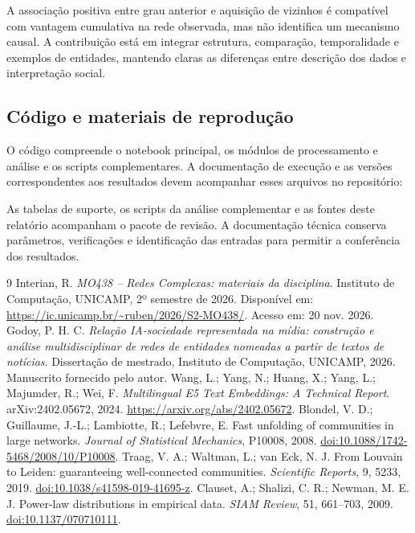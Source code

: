 \documentclass[11pt,a4paper]{article}
\begin{document}
A associação positiva entre grau anterior e aquisição de vizinhos é compatível com vantagem cumulativa na rede observada, mas não identifica um mecanismo causal. A contribuição está em integrar estrutura, comparação, temporalidade e exemplos de entidades, mantendo claras as diferenças entre descrição dos dados e interpretação social.

\subsection{Código e materiais de reprodução}
O código compreende o notebook principal, os módulos de processamento e análise e os scripts complementares. A documentação de execução e as versões correspondentes aos resultados devem acompanhar esses arquivos no repositório:

\noindent{}

As tabelas de suporte, os scripts da análise complementar e as fontes deste relatório acompanham o pacote de revisão. A documentação técnica conserva parâmetros, verificações e identificação das entradas para permitir a conferência dos resultados.

\begin{thebibliography}{9}\footnotesize\setlength{\itemsep}{1pt}\setlength{\parskip}{0pt}
 Interian, R. \textit{MO438 -- Redes Complexas: materiais da disciplina}. Instituto de Computação, UNICAMP, 2º semestre de 2026. Disponível em: \url{https://ic.unicamp.br/~ruben/2026/S2-MO438/}. Acesso em: 20 nov. 2026.
 Godoy, P. H. C. \textit{Relação IA-sociedade representada na mídia: construção e análise multidisciplinar de redes de entidades nomeadas a partir de textos de notícias}. Dissertação de mestrado, Instituto de Computação, UNICAMP, 2026. Manuscrito fornecido pelo autor.
 Wang, L.; Yang, N.; Huang, X.; Yang, L.; Majumder, R.; Wei, F. \textit{Multilingual E5 Text Embeddings: A Technical Report}. arXiv:2402.05672, 2024. \url{https://arxiv.org/abs/2402.05672}.
 Blondel, V. D.; Guillaume, J.-L.; Lambiotte, R.; Lefebvre, E. Fast unfolding of communities in large networks. \textit{Journal of Statistical Mechanics}, P10008, 2008. \href{https://doi.org/10.1088/1742-5468/2008/10/P10008}{doi:10.1088/1742-5468/2008/10/P10008}.
 Traag, V. A.; Waltman, L.; van Eck, N. J. From Louvain to Leiden: guaranteeing well-connected communities. \textit{Scientific Reports}, 9, 5233, 2019. \href{https://doi.org/10.1038/s41598-019-41695-z}{doi:10.1038/s41598-019-41695-z}.
 Clauset, A.; Shalizi, C. R.; Newman, M. E. J. Power-law distributions in empirical data. \textit{SIAM Review}, 51, 661--703, 2009. \href{https://doi.org/10.1137/070710111}{doi:10.1137/070710111}.
\end{thebibliography}
\end{document}

